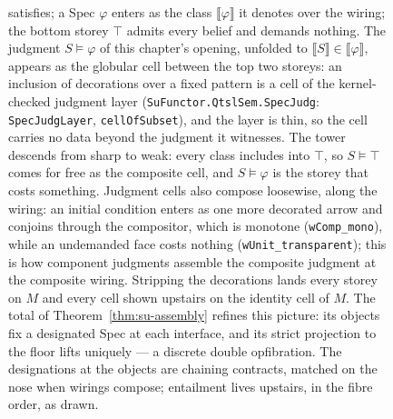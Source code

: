 \begin{figure}[t]
{satisfies; a Spec $\varphi$ enters as the class
$\llbracket \varphi \rrbracket$ it denotes over the wiring; the
bottom storey $\top$ admits every belief and demands nothing. The
judgment $S \vDash \varphi$ of this chapter's opening, unfolded to
$\llbracket S \rrbracket \in \llbracket \varphi \rrbracket$, appears
as the globular cell between the top two storeys: an inclusion of
decorations over a fixed pattern is a cell of the kernel-checked
judgment layer (\texttt{SuFunctor.QtslSem.SpecJudg}:
\texttt{SpecJudgLayer}, \texttt{cellOfSubset}), and the layer is
thin, so the cell carries no data beyond the judgment it witnesses.
The tower descends from sharp to weak: every class includes into
$\top$, so $S \vDash \top$ comes for free as the composite cell,
and $S \vDash \varphi$ is the storey that costs something. Judgment
cells also compose loosewise, along the wiring: an initial
condition enters as one more decorated arrow and conjoins through
the compositor, which is monotone (\texttt{wComp\_mono}), while an
undemanded face costs nothing (\texttt{wUnit\_transparent}); this
is how component judgments assemble the composite judgment at the
composite wiring. Stripping the decorations lands every storey on
$M$ and every cell shown upstairs on the identity cell of $M$. The
total of Theorem~\ref{thm:su-assembly} refines this picture: its
objects fix a designated Spec at each interface, and its strict
projection to the floor lifts uniquely --- a discrete double
opfibration. The designations at the objects are chaining
contracts, matched on the nose when wirings compose; entailment
lives upstairs, in the fibre order, as drawn.}
\label{fig:su-two-storey}
\end{figure}

